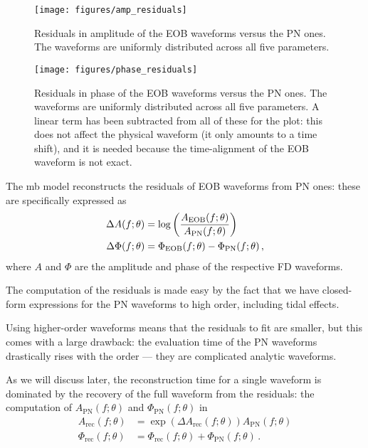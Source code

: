 \documentclass[main.tex]{subfiles}
\begin{document}
\begin{figure}[ht]
\centering
\texttt{[image: figures/amp\_residuals]}
\caption{Residuals in amplitude of the EOB waveforms versus the \ac{PN} ones. The waveforms are uniformly distributed across all five parameters. }
\label{fig:amp_residuals}
\end{figure}

\begin{figure}[ht]
\centering
\texttt{[image: figures/phase\_residuals]}
\caption{Residuals in phase of the \ac{EOB} waveforms versus the \ac{PN} ones. The waveforms are uniformly distributed across all five parameters.
A linear term has been subtracted from all of these for the plot: this does not affect the physical waveform (it only amounts to a time shift), and it is needed because the time-alignment of the \ac{EOB} waveform is not exact.}
\label{fig:phase_residuals}
\end{figure}

The \ac{mb} model reconstructs the residuals of \ac{EOB} waveforms from \ac{PN} ones: these are specifically expressed as 
%
\begin{align} \label{eq:amplitude-phase-residuals}
\Delta A(f;\theta ) &= \log \qty(\frac{A _{\text{EOB}} (f;\theta )}{A _{\text{PN}} (f;\theta )}) \\
\Delta \Phi (f; \theta ) &= \Phi _{\text{EOB}} (f; \theta ) - \Phi _{\text{PN}} (f; \theta )
\,,
\end{align}
%
where \(A\) and \(\Phi \) are the amplitude and phase of the respective \ac{FD} waveforms. 

The computation of the residuals is made easy by the fact that we have closed-form expressions for the \ac{PN} waveforms to high order, including tidal effects.

Using higher-order waveforms means that the residuals to fit are smaller, but this comes with a large drawback: the evaluation time of the \ac{PN} waveforms drastically rises with the order --- they are complicated analytic waveforms. 

As we will discuss later, the reconstruction time for a single waveform 
is dominated by the recovery of the full waveform from the residuals: the computation of \(A _{\text{PN}}(f; \theta )\) and \(\Phi _{\text{PN}}(f; \theta )\) in
%
\begin{align}\label{eq:amplitude-phase-reconstruction}
A _{\text{rec}} (f; \theta ) &= \exp( \Delta A _{\text{rec}} (f; \theta )) A _{\text{PN}}(f; \theta )  \\
\Phi _{\text{rec}} (f; \theta ) &= \Phi _{\text{rec}}(f; \theta ) + \Phi _{\text{PN}}(f; \theta )
\,.
\end{align}
\end{document}
